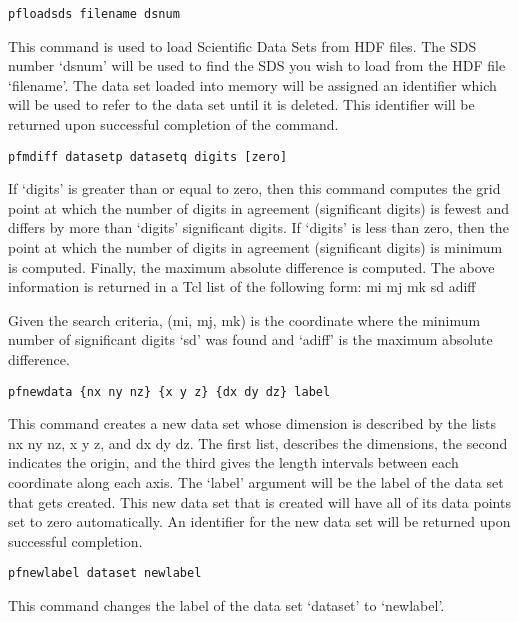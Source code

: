 \begin{description}
\item{\begin{verbatim}pfloadsds filename dsnum\end{verbatim}}
This command is used to load Scientific Data Sets from HDF files.    
The SDS number `dsnum' will be used to find the SDS you wish to load
from the HDF file `filename'.  The data set loaded into memory will
be assigned an identifier which will be used to refer to the data set
until it is deleted.  This identifier will be returned upon
successful completion of the command.  
        
\item{\begin{verbatim}pfmdiff datasetp datasetq digits [zero]\end{verbatim}}
If `digits' is greater than or equal to zero, then this command     
computes the grid point at which the number of digits in agreement    
(significant digits) is fewest and differs by more than `digits'    
significant digits.  If `digits' is less than zero, then the point  
at which the number of digits in agreement (significant digits) is    
minimum is computed.  Finally, the maximum absolute difference is     
computed.  The above information is returned in a Tcl list
of the following form:
{mi mj mk sd} adiff
   
Given the search criteria, (mi, mj, mk) is the coordinate where the
minimum number of significant digits `sd' was found and `adiff' is
the maximum absolute difference.        
        
        
\item{\begin{verbatim}pfnewdata {nx ny nz} {x y z} {dx dy dz} label\end{verbatim}}
This command creates a new data set whose dimension is described by
the lists {nx ny nz}, {x y z}, and {dx dy dz}.  The first list,
describes the dimensions, the second indicates the origin, and the
third gives the length intervals between each coordinate along each
axis.  The `label' argument will be the label of the data set that
gets created.  This new data set that is created will have all of
its data points set to zero automatically.  An identifier for the new
data set will be returned upon successful completion.


\item{\begin{verbatim}pfnewlabel dataset newlabel\end{verbatim}}
This command changes the label of the data set `dataset' to
`newlabel'.
 

\end{description}
